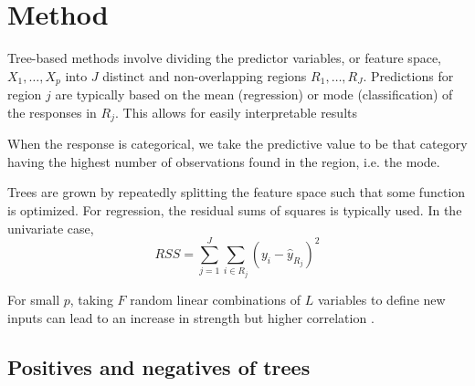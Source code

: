 \section{Method}


Tree-based methods involve dividing the predictor variables, or feature space, $X_1,\ldots,X_p$ into $J$ distinct and non-overlapping regions $R_1,\ldots,R_J$. Predictions for region $j$ are typically based on the mean (regression) or mode (classification) of the responses in $R_j$. This allows for easily interpretable results 

When the response is categorical, we take the predictive value to be that category having the highest number of observations found in the region, i.e. the mode.

Trees are grown by repeatedly splitting the feature space such that some function is optimized. For regression, the residual sums of squares is typically used. In the univariate case,
\[ RSS=\sum_{j=1}^J\sum_{i\in R_j}(y_i - \hat{y}_{R_j})^2 \]



For small $p$, taking $F$ random linear combinations of $L$ variables to define new inputs can lead to an increase in strength but higher correlation \citep{breiman:2001}. \cite{segal:2011} \cite{death:2002}


\subsection{Positives and negatives of trees}
